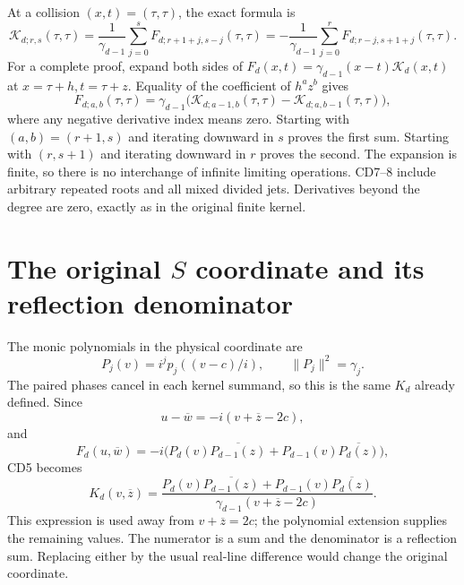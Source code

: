 At a collision \((x,t)=(\tau,\tau)\), the exact formula is
\begin{equation}\label{cdroot:eq:jets-collision}
 \boxed{\mathcal K_{d;r,s}(\tau,\tau)
  =\frac1{\gamma_{d-1}}
      \sum_{j=0}^{s}F_{d;r+1+j,s-j}(\tau,\tau)
  =-\frac1{\gamma_{d-1}}
      \sum_{j=0}^{r}F_{d;r-j,s+1+j}(\tau,\tau).}
 \tag{CD8}
\end{equation}
For a complete proof, expand both sides of
\(F_d(x,t)=\gamma_{d-1}(x-t)\mathcal K_d(x,t)\) at
\(x=\tau+h,t=\tau+z\). Equality of the coefficient of \(h^az^b\)
gives
\[
 F_{d;a,b}(\tau,\tau)=\gamma_{d-1}
 \bigl(\mathcal K_{d;a-1,b}(\tau,\tau)
       -\mathcal K_{d;a,b-1}(\tau,\tau)\bigr),
\]
where any negative derivative index means zero. Starting with
\((a,b)=(r+1,s)\) and iterating downward in \(s\) proves the first
sum. Starting with \((r,s+1)\) and iterating downward in \(r\)
proves the second. The expansion is finite, so there is no interchange
of infinite limiting operations. CD7--8 include arbitrary repeated
roots and all mixed divided jets. Derivatives beyond the degree are
zero, exactly as in the original finite kernel.

\section{The original \(S\) coordinate and its reflection denominator}

The monic polynomials in the physical coordinate are
\[
 P_j(v)=i^jp_j((v-c)/i),\qquad \|P_j\|^2=\gamma_j.
\]
The paired phases cancel in each kernel summand, so this is the same
\(K_d\) already defined. Since
\[
 u-\overline w=-i(v+\overline z-2c),
\]
and
\[
 F_d(u,\overline w)=-i\bigl(
 P_d(v)\overline{P_{d-1}(z)}+
 P_{d-1}(v)\overline{P_d(z)}\bigr),
\]
CD5 becomes
\begin{equation}\label{cdroot:eq:S-CD}
 \boxed{K_d(v,\overline z)=
 \frac{P_d(v)\overline{P_{d-1}(z)}+
       P_{d-1}(v)\overline{P_d(z)}}
      {\gamma_{d-1}(v+\overline z-2c)}.}
 \tag{CD9}
\end{equation}
This expression is used away from \(v+\overline z=2c\); the
polynomial extension supplies the remaining values. The numerator is a
sum and the denominator is a reflection sum. Replacing either by the
usual real-line difference would change the original coordinate.

